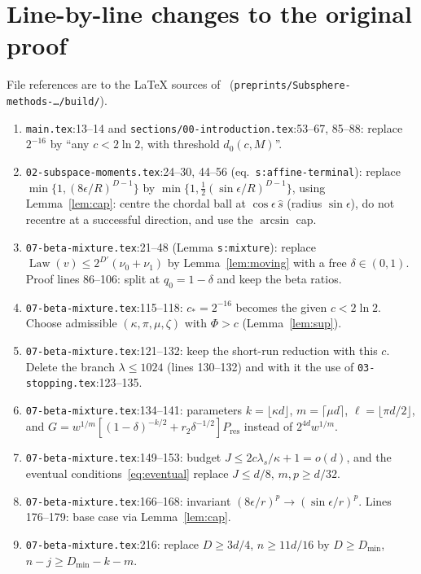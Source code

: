 \documentclass[11pt]{article}
\theoremstyle{definition}
\theoremstyle{remark}
\DeclareMathOperator{\Law}{Law}
\newcommand{\Ores}{P_{\mathrm{res}}}
\begin{document}
\appendix
\section{Line-by-line changes to the original proof}\label{app:changes}
File references are to the \LaTeX{} sources of~\cite{OAIsub} (\texttt{preprints/Subsphere-methods-\ldots/build/}).
\begin{enumerate}[label=C\arabic*.,leftmargin=2.2em]
\item \texttt{main.tex}:13--14 and \texttt{sections/00-introduction.tex}:53--67, 85--88: replace \(2^{-16}\) by
``any \(c<2\ln2\), with threshold \(d_0(c,M)\)''.
\item \texttt{02-subspace-moments.tex}:24--30, 44--56 (eq.~\texttt{s:affine-terminal}): replace
\(\min\{1,(8\epsilon/R)^{D-1}\}\) by \(\min\{1,\frac12(\sin\epsilon/R)^{D-1}\}\), using Lemma~\ref{lem:cap}: centre the chordal ball at
\(\cos\epsilon\,\widehat s\) (radius \(\sin\epsilon\)), do not recentre at a successful
direction, and use the \(\arcsin\) cap.
\item \texttt{07-beta-mixture.tex}:21--48 (Lemma \texttt{s:mixture}): replace \(\Law(v)\le2^{D'}(\nu_0+\nu_1)\) by Lemma~\ref{lem:moving}
with a free \(\delta\in(0,1)\). Proof lines 86--106: split at \(q_0=1-\delta\) and keep the beta ratios.
\item \texttt{07-beta-mixture.tex}:115--118: \(c_*=2^{-16}\) becomes the given \(c<2\ln2\). Choose admissible
\((\kappa,\pi,\mu,\zeta)\) with \(\Phi>c\) (Lemma~\ref{lem:sup}).
\item \texttt{07-beta-mixture.tex}:121--132: keep the short-run reduction with this \(c\). Delete the branch
\(\lambda\le1024\) (lines 130--132) and with it the use of \texttt{03-stopping.tex}:123--135.
\item \texttt{07-beta-mixture.tex}:134--141: parameters \(k=\lfloor\kappa d\rfloor\), \(m=\lceil\mu d\rceil\),
\(\ell=\lfloor\pi d/2\rfloor\), and \(G=w^{1/m}[(1-\delta)^{-k/2}+r_2\delta^{-1/2}]\Ores\) instead of \(2^{4d}w^{1/m}\).
\item \texttt{07-beta-mixture.tex}:149--153: budget \(J\le2c\lambda_s/\kappa+1=o(d)\), and the eventual
conditions~\eqref{eq:eventual} replace \(J\le d/8\), \(m,p\ge d/32\).
\item \texttt{07-beta-mixture.tex}:166--168: invariant \((8\epsilon/r)^p\to(\sin\epsilon/r)^p\). Lines 176--179: base case via
Lemma~\ref{lem:cap}.
\item \texttt{07-beta-mixture.tex}:216: replace \(D\ge3d/4\), \(n\ge11d/16\) by \(D\ge D_{\min}\), \(n-j\ge D_{\min}-k-m\).

\end{enumerate}
\end{document}
